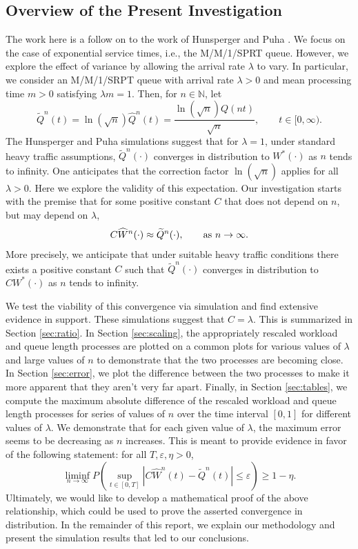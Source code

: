\documentclass[12pt]{article}
\theoremstyle{plain}
\theoremstyle{definition}
\theoremstyle{remark}
\newcommand{\N}{\mathbb{N}}
\newcommand{\What}{\widehat{W}^{n}(t)}
\newcommand{\Qtild}{\widetilde{Q}^{n}(t)}
\newcommand{\Wfhat}{\widehat{W}^{n}(\cdot)}
\newcommand{\Qftild}{\widetilde{Q}^{n}(\cdot)}
\begin{document}
\subsection{Overview of the Present Investigation}
The work here is a follow on to the work of Hunsperger and Puha \cite{puhahan12}.  We focus on the case of exponential service times, i.e., the M/M/1/SPRT queue.  However, we explore the effect of variance by allowing the arrival rate $\lambda$ to vary.  In particular, we consider an M/M/1/SRPT queue with arrival rate $\lambda>0$ and mean processing time $m>0$ satisfying
$\lambda m=1$.  Then, for $n\in\N$, let
\begin{equation}\label{eq:Qtild}
 \Qtild=\ln\left(\sqrt{n}\right)\widehat Q^n(t)=\frac{\ln(\sqrt{n})Q(nt)}{\sqrt{n}},\qquad t\in[0,\infty).
\end{equation}
The Hunsperger and Puha \cite{puhahan12} simulations suggest that for $\lambda=1$,
under standard heavy traffic assumptions, $\Qftild$ converges in distribution to $W^*(\cdot)$
as $n$ tends to infinity.  One anticipates that the correction factor
$\ln(\sqrt{n})$ applies for all $\lambda>0$.  Here we explore the validity of this expectation.  Our investigation starts with the premise that for some positive constant $C$ that does not depend on $n$, but may depend on $\lambda$,
\begin{equation}\label{eq:C}
C\Wfhat \approx \Qftild, \qquad\hbox{as }n\to\infty.
\end{equation}
More precisely, we anticipate that under suitable heavy traffic conditions there exists a positive constant $C$ such that
$\Qftild$ converges in distribution to $CW^*(\cdot)$ as $n$ tends to infinity.

We test the viability of this convergence via simulation and find extensive evidence in support.  These simulations suggest that $C=\lambda$.  This is summarized in Section \ref{sec:ratio}.  In Section \ref{sec:scaling}, the appropriately rescaled workload and queue length processes are plotted on a common plots for various values of $\lambda$ and large values of $n$ to demonstrate that the two processes are becoming close.  In Section \ref{sec:error}, we plot the difference between the two processes to make it more apparent that they aren't very far apart.  Finally, in Section \ref{sec:tables}, we compute the maximum absolute difference of the rescaled workload and queue length processes for series of values of $n$ over the time interval $[0,1]$ for different values of $\lambda$.  We  demonstrate that for each given value of $\lambda$, the maximum error seems to be decreasing as $n$ increases.  This is meant to provide evidence in favor of the following statement:  for all $T,\varepsilon, \eta>0$, 
\begin{equation} \label{eq:proof}
\liminf_{n\to\infty} P\left( \sup_{t\in[0,T]}\left| C\What - \Qtild \right| \le \varepsilon\right)\ge 1-\eta. 
\end{equation}
Ultimately, we would like to develop a mathematical proof of the above relationship, which could be used to prove
the asserted convergence in distribution.  In the remainder of this report, we explain our methodology and present the simulation results that led to our conclusions.
\end{document}
